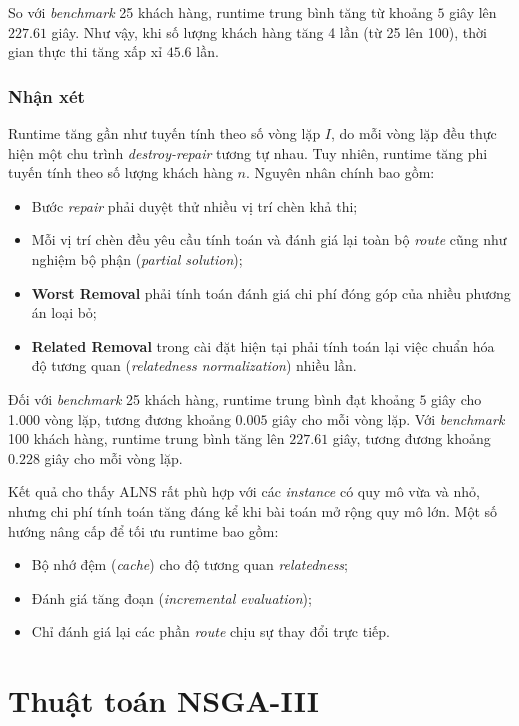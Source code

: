 \documentclass{article}
\begin{document}
So với \textit{benchmark} 25 khách hàng, runtime trung bình tăng từ khoảng $5$ giây lên $227.61$ giây. Như vậy, khi số lượng khách hàng tăng 4 lần (từ 25 lên 100), thời gian thực thi tăng xấp xỉ $45.6$ lần.

\subsubsection{Nhận xét}

Runtime tăng gần như tuyến tính theo số vòng lặp $I$, do mỗi vòng lặp đều thực hiện một chu trình \textit{destroy-repair} tương tự nhau. Tuy nhiên, runtime tăng phi tuyến tính theo số lượng khách hàng $n$. Nguyên nhân chính bao gồm:
\begin{itemize}
    \item Bước \textit{repair} phải duyệt thử nhiều vị trí chèn khả thi;
    \item Mỗi vị trí chèn đều yêu cầu tính toán và đánh giá lại toàn bộ \textit{route} cũng như nghiệm bộ phận (\textit{partial solution});
    \item \textbf{Worst Removal} phải tính toán đánh giá chi phí đóng góp của nhiều phương án loại bỏ;
    \item \textbf{Related Removal} trong cài đặt hiện tại phải tính toán lại việc chuẩn hóa độ tương quan (\textit{relatedness normalization}) nhiều lần.
\end{itemize}

Đối với \textit{benchmark} 25 khách hàng, runtime trung bình đạt khoảng $5$ giây cho 1.000 vòng lặp, tương đương khoảng $0.005$ giây cho mỗi vòng lặp. Với \textit{benchmark} 100 khách hàng, runtime trung bình tăng lên $227.61$ giây, tương đương khoảng $0.228$ giây cho mỗi vòng lặp.

Kết quả cho thấy ALNS rất phù hợp với các \textit{instance} có quy mô vừa và nhỏ, nhưng chi phí tính toán tăng đáng kể khi bài toán mở rộng quy mô lớn. Một số hướng nâng cấp để tối ưu runtime bao gồm:
\begin{itemize}
    \item Bộ nhớ đệm (\textit{cache}) cho độ tương quan \textit{relatedness};
    \item Đánh giá tăng đoạn (\textit{incremental evaluation});
    \item Chỉ đánh giá lại các phần \textit{route} chịu sự thay đổi trực tiếp.
\end{itemize}
\section{Thuật toán NSGA-III}
\end{document}

